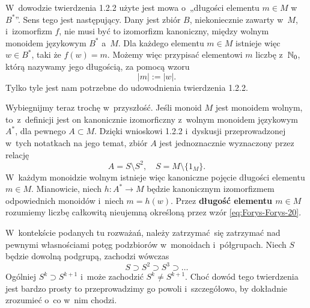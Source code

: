 \documentclass[a4paper,11pt]{article}
\begin{document}
\vspace{\spaceFour}





\start {} W~dowodzie twierdzenia 1.2.2 użyte jest mowa o~„długości
elementu $m \in M$ w~$B^{ * }$”. Sens tego jest następujący. Dany jest zbiór
$B$, niekoniecznie zawarty w~$M$, i~izomorfizm $f$, nie musi być to
izomorfizm kanoniczny, między wolnym monoidem językowym $B^{ * }$ a~$M$. Dla
każdego elementu $m \in M$ istnieje więc $w \in B^{ * }$, taki że $f( w ) = m$.
Możemy więc przypisać elementowi $m$ liczbę z~$\mathbb{N}_{ 0 }$, którą nazywamy
jego długością, za pomocą wzoru
\begin{equation}
  \label{eq:Forys-Forys-19}
  | m | := | w |.
\end{equation}
Tylko tyle jest nam potrzebne do udowodnienia twierdzenia 1.2.2.

Wybiegnijmy teraz trochę w~przyszłość. Jeśli monoid $M$ jest monoidem
wolnym, to~z~definicji jest on kanonicznie izomorficzny z~wolnym monoidem
językowym $A^{ * }$, dla pewnego $A \subset M$. Dzięki wnioskowi 1.2.2 i~dyskusji
przeprowadzonej w~tych notatkach na jego temat, zbiór $A$ jest jednoznacznie
wyznaczony przez relację
\begin{equation}
  \label{eq:Forys-Forys-20}
  A = S \setminus S^{ 2 }, \quad
  S = M \setminus \{ 1_{ M } \}.
\end{equation}
W~każdym monoidzie wolnym istnieje więc kanoniczne pojęcie długości
elementu $m \in M$. Mianowicie, niech $h : A^{ * } \to M$ będzie kanonicznym
izomorfizmem odpowiednich monoidów i~niech $m = h( w )$. Przez
\textbf{długość elementu $m \in M$} rozumiemy liczbę całkowitą nieujemną
określoną przez wzór \eqref{eq:Forys-Forys-20}.

\vspace{\spaceFour}





\start {} W~kontekście podanych tu rozważań, należy zatrzymać~się
zatrzymać nad pewnymi własnościami potęg podzbiorów w~monoidach
i~półgrupach. Niech $S$ będzie dowolną podgrupą, zachodzi wówczas
\begin{equation}
  \label{eq:Forys-Forys-22}
  S \supset S^{ 2 } \supset S^{ 3 } \supset \ldots
\end{equation}
Ogólniej $S^{ k } \supset S^{ k + 1 }$ i~może zachodzić $S^{ k } \neq S^{ k + 1 }$. Choć
dowód tego twierdzenia jest bardzo prosty to przeprowadzimy go powoli
i~szczegółowo, by dokładnie zrozumieć o~co w~nim chodzi.
\end{document}
